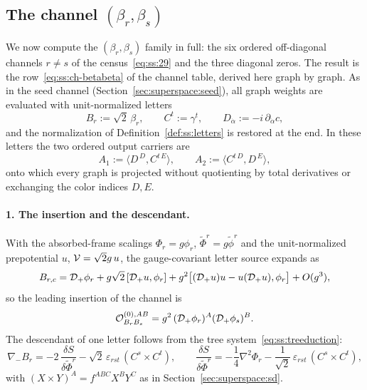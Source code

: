 
\subsection{The channel $(\beta_r,\beta_s)$}\label{sec:superspace:bb}

We now compute the $(\beta_r,\beta_s)$ family in full: the six ordered
off-diagonal channels $r\ne s$ of the census~\eqref{eq:ss:29} and the three
diagonal zeros. The result is the row~\eqref{eq:ss:ch-betabeta} of the channel
table, derived here graph by graph. As in the seed channel
(Section~\ref{sec:superspace:seed}), all graph weights are evaluated with
unit-normalized letters
\begin{equation}\label{eq:ss:bb-unit}
B_r:=\sqrt2\,\beta_r,\qquad C^t:=\gamma^t,\qquad D_{\dot\alpha}:=-i\,\partial_{\dot\alpha}c,
\end{equation}
and the normalization of Definition~\ref{def:ss:letters} is restored at the
end. In these letters the two ordered output carriers are
\begin{equation}\label{eq:ss:bb-carriers}
A_1:=\langle D^{\,D},C^{t\,E}\rangle,\qquad
A_2:=\langle C^{t\,D},D^{\,E}\rangle,
\end{equation}
onto which every graph is projected without quotienting by total derivatives
or exchanging the color indices $D,E$.

\paragraph{1. The insertion and the descendant.} With the absorbed-frame
scalings $\Phi_r=g\phi_r$, $\widetilde\Phi^r=g\widetilde\phi^r$ and the
unit-normalized prepotential $u$, $\mathcal{V}=\sqrt2 g\,u$, the gauge-covariant
letter source expands as
\begin{equation}\label{eq:ss:bb-resolvent}
B_{r,c}=\mathcal{D}_+\phi_r+g\sqrt2\,[\mathcal{D}_+u,\phi_r]
+g^2\big[(\mathcal{D}_+u)u-u(\mathcal{D}_+u),\phi_r\big]+O(g^3),
\end{equation}
so the leading insertion of the channel is
\begin{equation}\label{eq:ss:bb-insertion}
\mathcal O^{(0),AB}_{B_rB_s}=g^{2}\,(\mathcal{D}_+\phi_r)^{A}(\mathcal{D}_+\phi_s)^{B}.
\end{equation}
The descendant of one letter follows from the tree
system~\eqref{eq:ss:treeduction}:
\begin{equation}\label{eq:ss:bb-descendant}
\nabla_-B_r=-2\,\frac{\delta S}{\delta\widetilde\Phi^{r}}
-\sqrt2\,\varepsilon_{rst}\,(C^{s}\times C^{t}),
\qquad
\frac{\delta S}{\delta\widetilde\Phi^{r}}
=-\frac14\nabla^{2}\Phi_r-\frac{1}{\sqrt2}\,\varepsilon_{rst}\,(C^{s}\times C^{t}),
\end{equation}
with $(X\times Y)^A=f^{ABC}X^BY^C$ as in Section~\ref{sec:superspace:sd}.

